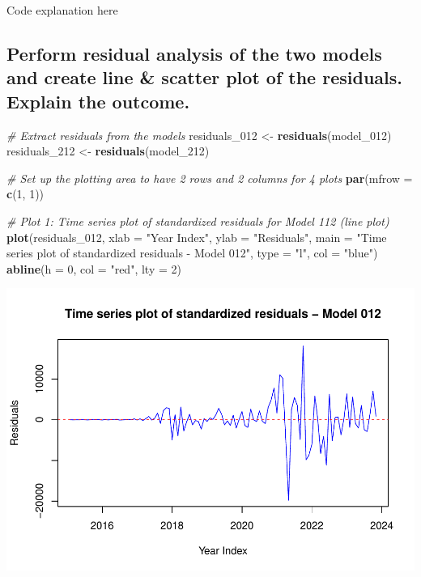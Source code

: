 \documentclass[
]{book}
\newenvironment{Shaded}{\begin{snugshade}}{\end{snugshade}}
\newcommand{\AttributeTok}[1]{\textcolor[rgb]{0.13,0.29,0.53}{#1}}
\newcommand{\CommentTok}[1]{\textcolor[rgb]{0.56,0.35,0.01}{\textit{#1}}}
\newcommand{\DecValTok}[1]{\textcolor[rgb]{0.00,0.00,0.81}{#1}}
\newcommand{\FunctionTok}[1]{\textcolor[rgb]{0.13,0.29,0.53}{\textbf{#1}}}
\newcommand{\NormalTok}[1]{#1}
\newcommand{\OtherTok}[1]{\textcolor[rgb]{0.56,0.35,0.01}{#1}}
\newcommand{\StringTok}[1]{\textcolor[rgb]{0.31,0.60,0.02}{#1}}
\begin{document}
Code explanation here

\subsection{Perform residual analysis of the two models and create line \& scatter plot of the residuals. Explain the outcome.}\label{perform-residual-analysis-of-the-two-models-and-create-line-scatter-plot-of-the-residuals.-explain-the-outcome.}

\begin{Shaded}
\begin{Highlighting}[]
\CommentTok{\# Extract residuals from the models}
\NormalTok{residuals\_012 }\OtherTok{\textless{}{-}} \FunctionTok{residuals}\NormalTok{(model\_012)}
\NormalTok{residuals\_212 }\OtherTok{\textless{}{-}} \FunctionTok{residuals}\NormalTok{(model\_212)}

\CommentTok{\# Set up the plotting area to have 2 rows and 2 columns for 4 plots}
\FunctionTok{par}\NormalTok{(}\AttributeTok{mfrow =} \FunctionTok{c}\NormalTok{(}\DecValTok{1}\NormalTok{, }\DecValTok{1}\NormalTok{))}

\CommentTok{\# Plot 1: Time series plot of standardized residuals for Model 112 (line plot)}
\FunctionTok{plot}\NormalTok{(residuals\_012,}
     \AttributeTok{xlab =} \StringTok{"Year Index"}\NormalTok{, }\AttributeTok{ylab =} \StringTok{"Residuals"}\NormalTok{,}
     \AttributeTok{main =} \StringTok{"Time series plot of standardized residuals {-} Model 012"}\NormalTok{,}
     \AttributeTok{type =} \StringTok{"l"}\NormalTok{, }\AttributeTok{col =} \StringTok{"blue"}\NormalTok{)}
\FunctionTok{abline}\NormalTok{(}\AttributeTok{h =} \DecValTok{0}\NormalTok{, }\AttributeTok{col =} \StringTok{"red"}\NormalTok{, }\AttributeTok{lty =} \DecValTok{2}\NormalTok{)}
\end{Highlighting}
\end{Shaded}

\includegraphics{bookdown-demo_files/figure-latex/unnamed-chunk-48-1.pdf}
\end{document}
